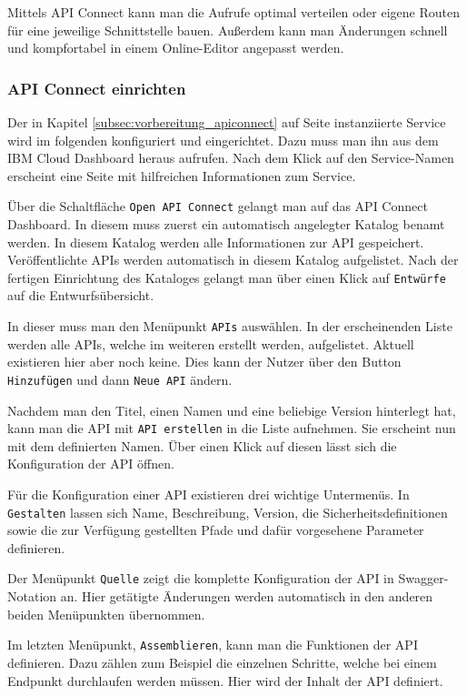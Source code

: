 Mittels API Connect kann man die Aufrufe optimal verteilen oder eigene Routen für eine jeweilige Schnittstelle bauen.
Außerdem kann man Änderungen schnell und kompfortabel in einem Online-Editor angepasst werden.

\subsubsection{API Connect einrichten}
Der in Kapitel \ref{subsec:vorbereitung_apiconnect} auf Seite \pageref{subsec:vorbereitung_apiconnect} instanziierte
Service wird im folgenden konfiguriert und eingerichtet. Dazu muss man ihn aus dem IBM Cloud Dashboard heraus aufrufen.
Nach dem Klick auf den Service-Namen erscheint eine Seite mit hilfreichen Informationen zum Service.

Über die Schaltfläche \texttt{Open API Connect} gelangt man auf das API Connect Dashboard. In diesem muss zuerst ein
automatisch angelegter Katalog benamt werden. In diesem Katalog werden alle Informationen zur API gespeichert.
Veröffentlichte APIs werden automatisch in diesem Katalog aufgelistet. Nach der fertigen Einrichtung des Kataloges gelangt
man über einen Klick auf \texttt{Entwürfe} auf die Entwurfsübersicht.

In dieser muss man den Menüpunkt \texttt{APIs} auswählen. In der erscheinenden Liste werden alle APIs, welche im weiteren
erstellt werden, aufgelistet. Aktuell existieren hier aber noch keine. Dies kann der Nutzer über den Button
\texttt{Hinzufügen} und dann \texttt{Neue API} ändern.

Nachdem man den Titel, einen Namen und eine beliebige Version hinterlegt hat, kann man die API mit \texttt{API erstellen}
in die Liste aufnehmen. Sie erscheint nun mit dem definierten Namen. Über einen Klick auf diesen lässt sich die
Konfiguration der API öffnen.

Für die Konfiguration einer API existieren drei wichtige Untermenüs. In \texttt{Gestalten} lassen sich Name, Beschreibung,
Version, die Sicherheitsdefinitionen sowie die zur Verfügung gestellten Pfade und dafür vorgesehene Parameter definieren.

Der Menüpunkt \texttt{Quelle} zeigt die komplette Konfiguration der API in Swagger-Notation an. Hier getätigte Änderungen
werden automatisch in den anderen beiden Menüpunkten übernommen.

Im letzten Menüpunkt, \texttt{Assemblieren}, kann man die Funktionen der API definieren. Dazu zählen zum Beispiel die
einzelnen Schritte, welche bei einem Endpunkt durchlaufen werden müssen. Hier wird der Inhalt der API definiert.

